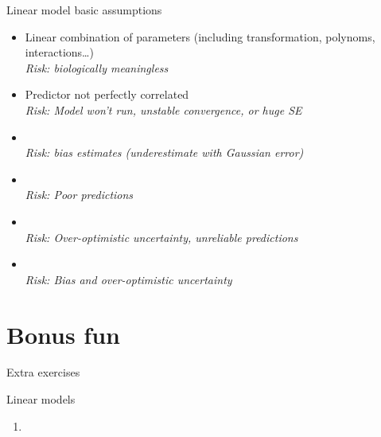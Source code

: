 \documentclass[10pt]{beamer}\usepackage[]{graphicx}\usepackage[]{color}
\begin{document}
\begin{frame}{Linear model basic assumptions}
 \begin{block}{}
     \begin{itemize}[<+->]
      \item Linear combination of parameters (including transformation, polynoms, interactions\dots)\\ \textit{Risk: biologically meaningless}
      \item Predictor not perfectly correlated \\ \textit{Risk: Model won't run, unstable convergence, or huge SE}
       \item {\color{red!20!black}{Little error in predictors}}\\ \textit{Risk: bias estimates (underestimate with Gaussian error)}
       \item {\color{red!50!black}{Gaussian error distribution}}\\ \textit{Risk: Poor predictions}
       \item {\color{red!70!black}{Homoscedasticity (constant error variance)}}\\ \textit{Risk: Over-optimistic uncertainty, unreliable predictions}
       \item {\color{red!99!black}{Independence of error}}\\ \textit{Risk: Bias and over-optimistic uncertainty}
     \end{itemize}
 \end{block}
\end{frame}

\section{Bonus fun}
\begin{frame}{Extra exercises}

\begin{alertblock}{Linear models}
  \begin{enumerate}
    \item 
  \end{enumerate}
\end{alertblock}
\end{frame}
\end{document}
